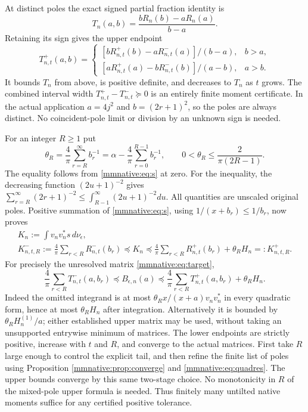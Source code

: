 \documentclass[11pt]{article}
\begin{document}
At distinct poles the exact signed partial fraction identity is
\begin{equation}\label{mmnative:eq:partialfraction}
 T_n(a,b)=\frac{bR_n(b)-aR_n(a)}{b-a}.
\end{equation}
Retaining its sign gives the upper endpoint
\begin{equation}\label{mmnative:eq:quadraticupper}
 T_{n,t}^+(a,b)=
 \begin{cases}
 [bR_{n,t}^+(b)-aR_{n,t}^-(a)]/(b-a),&b>a,\\[1mm]
 [aR_{n,t}^+(a)-bR_{n,t}^-(b)]/(a-b),&a>b.
 \end{cases}
\end{equation}
It bounds $T_n$ from above, is positive definite, and decreases
to $T_n$ as $t$ grows.  The combined interval width
$T_{n,t}^+-T_{n,t}^-\succeq0$ is an entirely finite moment
certificate.  In the actual application $a=4j^2$ and
$b=(2r+1)^2$, so the poles are always distinct.  No coincident-pole
limit or division by an unknown sign is needed.

For an integer $R\ge1$ put
\begin{equation}\label{mmnative:eq:theta}
 \theta_R=\frac4\pi\sum_{r=R}^\infty b_r^{-1}
 =\alpha-\frac4\pi\sum_{r=0}^{R-1}b_r^{-1},\qquad
 0<\theta_R\le\frac{2}{\pi(2R-1)}.
\end{equation}
The equality follows from \eqref{mmnative:eq:s} at zero.  For the inequality,
the decreasing function $(2u+1)^{-2}$ gives
$\sum_{r=R}^\infty(2r+1)^{-2}\le\int_{R-1}^\infty(2u+1)^{-2}du$.
All quantities are unscaled original poles.  Positive summation of
\eqref{mmnative:eq:s}, using $1/(x+b_r)\le1/b_r$, now proves
\begin{equation}\label{mmnative:eq:tiltKbounds}
 \begin{gathered}
 K_n:=\int v_nv_n^*s\,d\nu_\epsilon,\\
 K_{n,t,R}^-:=\frac4\pi\sum_{r<R}R_{n,t}^-(b_r)
 \preceq K_n\preceq
 \frac4\pi\sum_{r<R}R_{n,t}^+(b_r)+\theta_RH_n
 =:K_{n,t,R}^+.
 \end{gathered}
\end{equation}
For precisely the unresolved matrix \eqref{mmnative:eq:target},
\begin{equation}\label{mmnative:eq:tiltBbounds}
 \boxed{\frac4\pi\sum_{r<R}T_{n,t}^-(a,b_r)
 \preceq B_{\epsilon,n}(a)\preceq
 \frac4\pi\sum_{r<R}T_{n,t}^+(a,b_r)+\theta_RH_n.}
\end{equation}
Indeed the omitted integrand is at most
$\theta_R x/(x+a)v_nv_n^*$ in every quadratic form, hence at most
$\theta_RH_n$ after integration.  Alternatively it is bounded by
$\theta_RH_n^{(1)}/a$; either established upper matrix may be used,
without taking an unsupported entrywise minimum of matrices.
The lower endpoints are strictly positive, increase with $t$ and $R$,
and converge to the actual matrices.  First take $R$ large enough to
control the explicit tail, and then refine the finite list of poles
using Proposition \ref{mmnative:prop:converge} and \eqref{mmnative:eq:quadres}.  The
upper bounds converge by this same two-stage choice.  No monotonicity
in $R$ of the mixed-pole upper formula is needed.  Thus finitely many
untilted native moments suffice for any certified positive tolerance.
\end{document}
